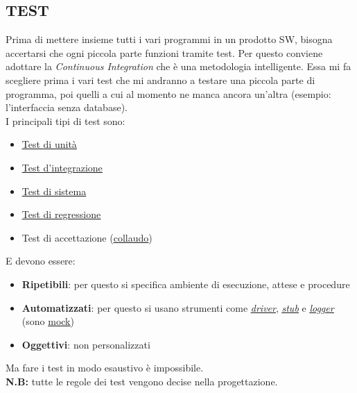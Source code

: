 		\subsection{TEST} 	\label{test}	%
		Prima di mettere insieme tutti i vari programmi in un prodotto SW, bisogna accertarsi che ogni piccola parte funzioni tramite test. %
		Per questo conviene adottare la \textit{Continuous Integration} che è una metodologia intelligente. Essa mi fa scegliere prima i vari test che mi andranno a testare una piccola parte di programma, poi quelli a cui al momento ne manca ancora un'altra (esempio: l'interfaccia senza database). \\
		I principali tipi di test sono:
		\begin{itemize}
			\item \underline{\hyperref[testunita]{Test di unità}}
			\item \underline{\hyperref[testintegrazione]{Test d'integrazione}}
			\item \underline{\hyperref[testsistema]{Test di sistema}}
			\item \underline{\hyperref[testregressione]{Test di regressione}}
			\item Test di accettazione (\underline{\hyperref[collaudo]{collaudo}})
		\end{itemize}
		E devono essere:
		\begin{itemize}
			\item \textbf{Ripetibili}: per questo si specifica ambiente di esecuzione, attese e procedure
			\item \textbf{Automatizzati}: per questo si usano strumenti come \textit{\underline{\hyperref[driver]{driver}}}, \textit{\underline{\hyperref[stub]{stub}}} e \textit{\underline{\hyperref[logger]{logger}}} (sono \underline{\hyperref[mock]{mock}})
			\item \textbf{Oggettivi}: non personalizzati
		\end{itemize}
		Ma fare i test in modo esaustivo è impossibile. \\
		\textbf{N.B:} tutte le regole dei test vengono decise nella progettazione.

